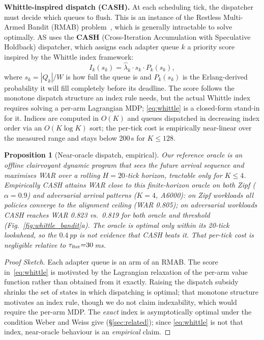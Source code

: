 \documentclass[conference]{IEEEtran}
\newtheorem{proposition}{Proposition}
\newcommand{\asys}{AS\xspace}
\begin{document}
\textbf{Whittle-inspired dispatch (CASH).}
At each scheduling tick, the dispatcher must decide which queues to
flush.
This is an instance of the Restless Multi-Armed Bandit (RMAB)
problem~\cite{papadimitriou1994complexity},
which is generally intractable to solve optimally.
\asys uses the \textbf{CASH} (Cross-Iteration Accumulation with Speculative
Holdback) dispatcher, which assigns each adapter queue $k$ a priority score
inspired by the Whittle index framework:
\begin{equation}
I_k(s_k) = \hat\lambda_k \cdot s_k \cdot P_k(s_k),
\label{eq:whittle}
\end{equation}
where $s_k = |Q_k|/W$ is how full the queue is and $P_k(s_k)$ is the
Erlang-derived probability it will fill completely before its deadline.
The score follows the monotone dispatch structure an index rule needs, but the
actual Whittle index requires solving a per-arm Lagrangian MDP;
\eqref{eq:whittle} is a closed-form stand-in for it.
Indices are computed in $O(K)$ and queues dispatched in decreasing index order
via an $O(K\log K)$ sort; the per-tick cost is empirically near-linear over the
measured range and stays below 200\,\textmu s for $K{\le}128$.

\begin{proposition}[Near-oracle dispatch, empirical]
\label{prop:whittle}
Our reference \emph{oracle} is an offline clairvoyant dynamic program
that sees the future arrival sequence and maximises WAR over a rolling
$H{=}20$-tick horizon, tractable only for $K{\leq}4$.
Empirically CASH attains WAR close to this finite-horizon oracle on both
Zipf ($\alpha{=}0.9$) and adversarial arrival patterns ($K{=}4$, A6000):
on Zipf workloads all policies converge to the alignment ceiling (WAR 0.805);
on adversarial workloads CASH reaches WAR 0.823 vs.\ 0.819 for both oracle and
threshold (Fig.~\ref{fig:whittle_bandit}a).  The oracle is optimal only within
its 20-tick lookahead, so the $0.4$\,pp is not evidence that CASH beats it.
That per-tick cost is negligible relative to $\tau_{\rm iter}{=}30$\,ms.
\end{proposition}

\begin{proof}[Proof Sketch]
Each adapter queue is an arm of an RMAB.
The score in~\eqref{eq:whittle} is motivated by the Lagrangian relaxation of the
per-arm value function rather than obtained from it exactly.
Raising the dispatch subsidy shrinks the set of states in which dispatching is
optimal; that monotone structure motivates an index rule, though we do not claim
indexability, which would require the per-arm MDP.
The \emph{exact} index is asymptotically optimal under the condition Weber and
Weiss give (\S\ref{sec:related}); since \eqref{eq:whittle} is not that index,
near-oracle behaviour is an \emph{empirical} claim.
\end{proof}
\end{document}
